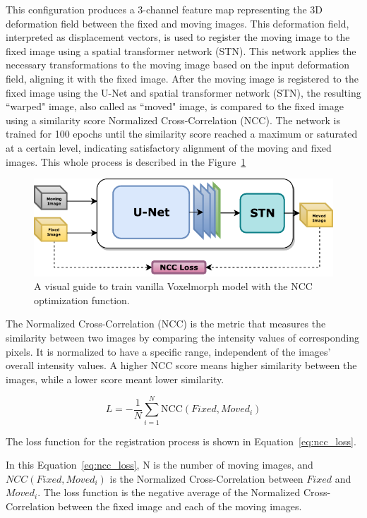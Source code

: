 \documentclass{book}
\begin{document}
	This configuration produces a 3-channel feature map representing the 3D deformation field between the fixed and moving images. This deformation field, interpreted as displacement vectors, is used to register the moving image to the fixed image using a spatial transformer network (STN). This network applies the necessary transformations to the moving image based on the input deformation field, aligning it with the fixed image. After the moving image is registered to the fixed image using the U-Net and spatial transformer network (STN), the resulting ``warped" image, also called as ``moved" image, is compared to the fixed image using a similarity score Normalized Cross-Correlation (NCC). The network is trained for 100 epochs until the similarity score reached a maximum or saturated at a certain level, indicating satisfactory alignment of the moving and fixed images. This whole process is described in the Figure~\ref{fig:block_method1}
	
	\begin{figure}[h!]
		\centering
		\includegraphics{resources/chapter4/methods/method1.pdf}
		\caption{A visual guide to train vanilla Voxelmorph model with the NCC optimization function.}
		\label{fig:block_method1}
	\end{figure}
	
	The Normalized Cross-Correlation (NCC) is the metric that measures the similarity between two images by comparing the intensity values of corresponding pixels. It is normalized to have a specific range, independent of the images' overall intensity values. A higher NCC score means higher similarity between the images, while a lower score meant lower similarity.
	
	\begin{equation}\label{eq:ncc_loss}
	L = -\frac{1}{N} \sum_{i=1}^N \text{NCC}(Fixed, Moved_i)
	\end{equation}
	
	The loss function for the registration process is shown in Equation~\ref{eq:ncc_loss}.
	
	In this Equation~\ref{eq:ncc_loss}, N is the number of moving images, and $NCC(Fixed, Moved_i)$ is the Normalized Cross-Correlation between $Fixed$ and $Moved_i$. The loss function is the negative average of the Normalized Cross-Correlation between the fixed image and each of the moving images.
	
\end{document}
